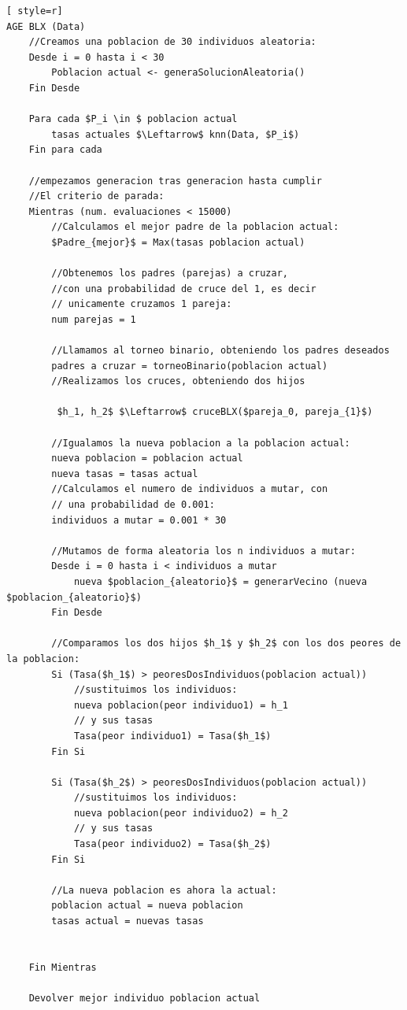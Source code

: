 \begin{lstlisting}[ style=r]
AGE BLX (Data)
	//Creamos una poblacion de 30 individuos aleatoria:
	Desde i = 0 hasta i < 30
		Poblacion actual <- generaSolucionAleatoria()
	Fin Desde
	
	Para cada $P_i \in $ poblacion actual
		tasas actuales $\Leftarrow$ knn(Data, $P_i$)
	Fin para cada
	
	//empezamos generacion tras generacion hasta cumplir
	//El criterio de parada:
	Mientras (num. evaluaciones < 15000)
		//Calculamos el mejor padre de la poblacion actual:
		$Padre_{mejor}$ = Max(tasas poblacion actual)
		
		//Obtenemos los padres (parejas) a cruzar, 
		//con una probabilidad de cruce del 1, es decir
		// unicamente cruzamos 1 pareja:
		num parejas = 1
		
		//Llamamos al torneo binario, obteniendo los padres deseados
		padres a cruzar = torneoBinario(poblacion actual)
		//Realizamos los cruces, obteniendo dos hijos
		
		 $h_1, h_2$ $\Leftarrow$ cruceBLX($pareja_0, pareja_{1}$)
	
		//Igualamos la nueva poblacion a la poblacion actual:
		nueva poblacion = poblacion actual
		nueva tasas = tasas actual
		//Calculamos el numero de individuos a mutar, con
		// una probabilidad de 0.001:
		individuos a mutar = 0.001 * 30
		
		//Mutamos de forma aleatoria los n individuos a mutar:
		Desde i = 0 hasta i < individuos a mutar
			nueva $poblacion_{aleatorio}$ = generarVecino (nueva $poblacion_{aleatorio}$)
		Fin Desde
		
		//Comparamos los dos hijos $h_1$ y $h_2$ con los dos peores de la poblacion:
		Si (Tasa($h_1$) > peoresDosIndividuos(poblacion actual))
			//sustituimos los individuos:
			nueva poblacion(peor individuo1) = h_1
			// y sus tasas
			Tasa(peor individuo1) = Tasa($h_1$)
		Fin Si
		
		Si (Tasa($h_2$) > peoresDosIndividuos(poblacion actual))
			//sustituimos los individuos:
			nueva poblacion(peor individuo2) = h_2
			// y sus tasas
			Tasa(peor individuo2) = Tasa($h_2$)
		Fin Si
		
		//La nueva poblacion es ahora la actual:
		poblacion actual = nueva poblacion
		tasas actual = nuevas tasas
		
	
	Fin Mientras
	
	Devolver mejor individuo poblacion actual
\end{lstlisting}



